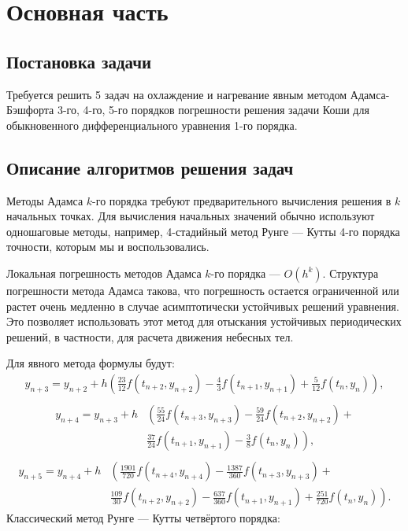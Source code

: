 \documentclass[a4paper,fleqn,14pt,titlepage]{extarticle}
\begin{document}
	\section{Основная часть}
	\subsection{Постановка задачи}
	Требуется решить 5 задач на охлаждение и нагревание явным методом Адамса-Бэшфорта 3-го, 4-го, 5-го порядков погрешности решения задачи Коши для обыкновенного дифференциального уравнения 1-го порядка.
	\subsection{Описание алгоритмов решения задач}
	Методы Адамса ${k}$-го порядка требуют предварительного вычисления решения в ${k}$ начальных точках. Для вычисления начальных значений обычно используют одношаговые методы, например, 4-стадийный метод Рунге — Кутты 4-го порядка точности, которым мы и воспользовались.
	
	Локальная погрешность методов Адамса ${k}$-го порядка — ${O(h^{k})}$. Структура погрешности метода Адамса такова, что погрешность остается ограниченной или растет очень медленно в случае асимптотически устойчивых решений уравнения. Это позволяет использовать этот метод для отыскания устойчивых периодических решений, в частности, для расчета движения небесных тел.
	
	Для явного метода формулы будут:
	\begin{equation}
		\begin{aligned}
			y_{n+3} = y_{n+2} + h\left( \frac{23}{12} f(t_{n+2}, y_{n+2}) - \frac{4}{3} f(t_{n+1}, y_{n+1}) + \frac{5}{12}f(t_n, y_n)\right) , \\
		\end{aligned}
	\end{equation}
	\begin{equation}
		\begin{aligned}
			y_{n+4} = y_{n+3} + h&\left( \frac{55}{24} f(t_{n+3}, y_{n+3}) - \frac{59}{24} f(t_{n+2}, y_{n+2}) +\right. \\ &\left. \frac{37}{24} f(t_{n+1}, y_{n+1}) - \frac{3}{8} f(t_n, y_n) \right) , \\
		\end{aligned}
	\end{equation}
	\begin{equation}
		\begin{aligned}
			y_{n+5} = y_{n+4} + h&\left( \frac{1901}{720} f(t_{n+4}, y_{n+4}) - \frac{1387}{360} f(t_{n+3}, y_{n+3}) +\right. \\ &\left. \frac{109}{30} f(t_{n+2}, y_{n+2}) - \frac{637}{360} f(t_{n+1}, y_{n+1}) + \frac{251}{720} f(t_n, y_n) \right) .
		\end{aligned}
	\end{equation}
	Классический метод Рунге — Кутты четвёртого порядка:
	
\end{document}
